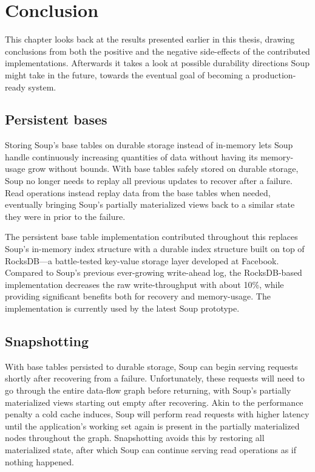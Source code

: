 \chapter{Conclusion}\label{chap:conclusion}

This chapter looks back at the results presented earlier in this thesis, drawing
conclusions from both the positive and the negative side-effects of the
contributed implementations. Afterwards it takes a look at possible durability
directions Soup might take in the future, towards the eventual goal of becoming
a production-ready system.

\newpage

\section{Persistent bases}

Storing Soup's base tables on durable storage instead of in-memory lets Soup
handle continuously increasing quantities of data without having its
memory-usage grow without bounds. With base tables safely stored on durable
storage, Soup no longer needs to replay all previous updates to recover after a
failure. Read operations instead replay data from the base tables when needed,
eventually bringing Soup's partially materialized views back to a similar state
they were in prior to the failure.

The persistent base table implementation contributed throughout this replaces
Soup's in-memory index structure with a durable index structure built on top of
RocksDB---a battle-tested key-value storage layer developed at Facebook.
Compared to Soup's previous ever-growing write-ahead log, the RocksDB-based
implementation decreases the raw write-throughput with about 10\%, while
providing significant benefits both for recovery and memory-usage. The
implementation is currently used by the latest Soup prototype.

\section{Snapshotting}

With base tables persisted to durable storage, Soup can begin serving requests
shortly after recovering from a failure. Unfortunately, these requests will need
to go through the entire data-flow graph before returning, with Soup's partially
materialized views starting out empty after recovering. Akin to the performance
penalty a cold cache induces, Soup will perform read requests with higher
latency until the application's working set again is present in the partially
materialized nodes throughout the graph. Snapshotting avoids this by restoring
all materialized state, after which Soup can continue serving read operations as
if nothing happened.

